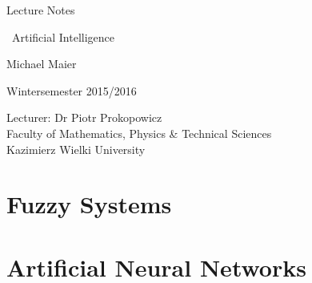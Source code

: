 \documentclass[12pt,a4paper]{scrartcl}
\begin{document}
  \pagestyle{empty}

  \begin{titlepage}

    \vspace*{2cm}

	 \begin{center} \large

    Lecture Notes\\
    \vspace*{2cm}

    {\huge \ Artificial Intelligence}
    \vspace*{2.0cm}

    Michael Maier \\
    \vspace*{1.5cm}

    Wintersemester 2015/2016
    \vspace*{2.8cm}


	Lecturer: Dr Piotr Prokopowicz \\[1cm]
   Faculty of Mathematics, Physics \& Technical Sciences \\[1cm]
		Kazimierz Wielki University

 	\end{center}
 \end{titlepage}


\tableofcontents


  \pagestyle{headings}

\newpage



\part{Fuzzy Systems}

\newpage


\part{Artificial Neural Networks}

\newpage
\end{document}
